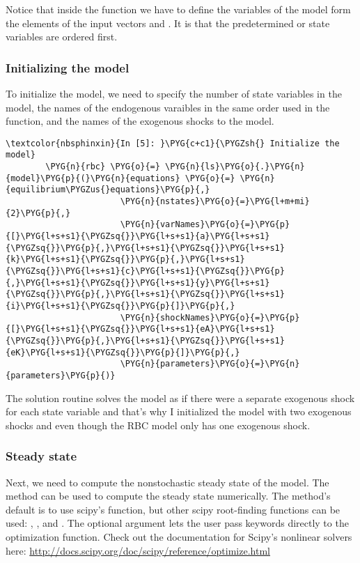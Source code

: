\documentclass[letterpaper,10pt,openany,oneside,english]{sphinxmanual}
\begin{document}
Notice that inside the function we have to define the variables of the
model form the elements of the input vectors  and
. It is  that the predetermined or state
variables are ordered first.


\subsubsection{Initializing the model}
\label{\detokenize{examples:Initializing-the-model}}
To initialize the model, we need to specify the number of state
variables in the model, the names of the endogenous varaibles in the
same order used in the  function, and the names
of the exogenous shocks to the model.

\begin{Verbatim}[commandchars=\\\{\}]
\textcolor{nbsphinxin}{In [5]: }\PYG{c+c1}{\PYGZsh{} Initialize the model}
        \PYG{n}{rbc} \PYG{o}{=} \PYG{n}{ls}\PYG{o}{.}\PYG{n}{model}\PYG{p}{(}\PYG{n}{equations} \PYG{o}{=} \PYG{n}{equilibrium\PYGZus{}equations}\PYG{p}{,}
                       \PYG{n}{nstates}\PYG{o}{=}\PYG{l+m+mi}{2}\PYG{p}{,}
                       \PYG{n}{varNames}\PYG{o}{=}\PYG{p}{[}\PYG{l+s+s1}{\PYGZsq{}}\PYG{l+s+s1}{a}\PYG{l+s+s1}{\PYGZsq{}}\PYG{p}{,}\PYG{l+s+s1}{\PYGZsq{}}\PYG{l+s+s1}{k}\PYG{l+s+s1}{\PYGZsq{}}\PYG{p}{,}\PYG{l+s+s1}{\PYGZsq{}}\PYG{l+s+s1}{c}\PYG{l+s+s1}{\PYGZsq{}}\PYG{p}{,}\PYG{l+s+s1}{\PYGZsq{}}\PYG{l+s+s1}{y}\PYG{l+s+s1}{\PYGZsq{}}\PYG{p}{,}\PYG{l+s+s1}{\PYGZsq{}}\PYG{l+s+s1}{i}\PYG{l+s+s1}{\PYGZsq{}}\PYG{p}{]}\PYG{p}{,}
                       \PYG{n}{shockNames}\PYG{o}{=}\PYG{p}{[}\PYG{l+s+s1}{\PYGZsq{}}\PYG{l+s+s1}{eA}\PYG{l+s+s1}{\PYGZsq{}}\PYG{p}{,}\PYG{l+s+s1}{\PYGZsq{}}\PYG{l+s+s1}{eK}\PYG{l+s+s1}{\PYGZsq{}}\PYG{p}{]}\PYG{p}{,}
                       \PYG{n}{parameters}\PYG{o}{=}\PYG{n}{parameters}\PYG{p}{)}
\end{Verbatim}

The solution routine solves the model as if there were a separate
exogenous shock for each state variable and that's why I initialized the
model with two exogenous shocks  and  even though the RBC
model only has one exogenous shock.


\subsubsection{Steady state}
\label{\detokenize{examples:Steady-state}}
Next, we need to compute the nonstochastic steady state of the model.
The  method can be used to compute the steady state
numerically. The method's default is to use scipy's  function,
but other scipy root-finding functions can be used: ,
, and . The optional argument  lets
the user pass keywords directly to the optimization function. Check out
the documentation for Scipy's nonlinear solvers here:
\url{http://docs.scipy.org/doc/scipy/reference/optimize.html}
\end{document}
